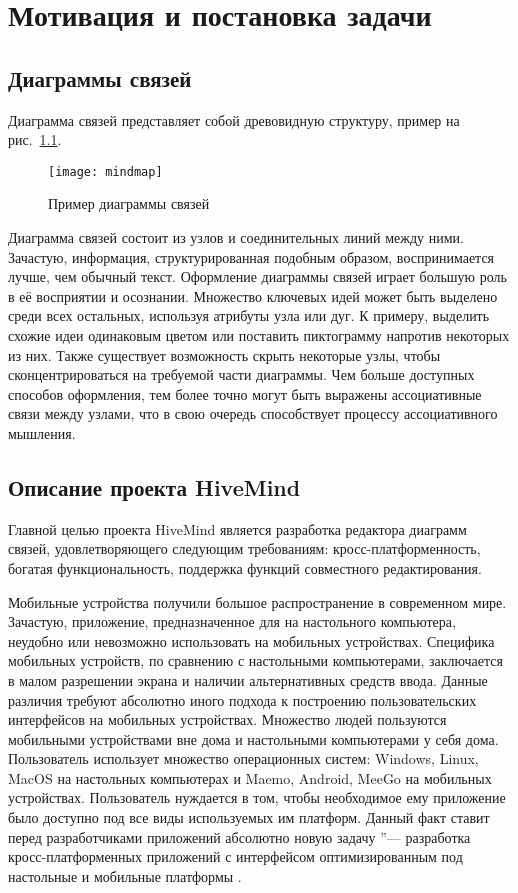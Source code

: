\newpage

\chapter{Мотивация и постановка задачи}
\label{ch:chapter_1}

\section{Диаграммы связей}
\label{sec:mindmaps}
Диаграмма связей представляет собой древовидную структуру, пример на
рис.~\ref{pic:mindmap}.

\begin{figure}[h!]
  \centering \texttt{[image: mindmap]}
  \caption{Пример диаграммы связей}
  \label{pic:mindmap}
\end{figure}

Диаграмма связей состоит из узлов и соединительных линий между ними. Зачастую,
информация, структурированная подобным образом, воспринимается лучше, чем
обычный текст. Оформление диаграммы связей играет большую роль в её восприятии и
осознании. Множество ключевых идей может быть выделено среди всех остальных,
используя атрибуты узла или дуг. К примеру, выделить схожие идеи одинаковым
цветом или поставить пиктограмму напротив некоторых из них. Также существует
возможность скрыть некоторые узлы, чтобы сконцентрироваться на требуемой части
диаграммы. Чем больше доступных способов оформления, тем более точно могут быть
выражены ассоциативные связи между узлами, что в свою очередь способствует
процессу ассоциативного мышления.


\section{Описание проекта HiveMind}
\label{sec:project_summary}
Главной целью проекта HiveMind является разработка редактора диаграмм связей,
удовлетворяющего следующим требованиям: кросс-платформенность, богатая
функциональность, поддержка функций совместного редактирования.

Мобильные устройства получили большое распространение в современном мире.
Зачастую, приложение, предназначенное для на настольного компьютера, неудобно
или невозможно использовать на мобильных устройствах. Специфика мобильных
устройств, по сравнению с настольными компьютерами, заключается в малом
разрешении экрана и наличии альтернативных средств ввода. Данные различия
требуют абсолютно иного подхода к построению пользовательских интерфейсов на
мобильных устройствах. Множество людей пользуются мобильными устройствами вне
дома и настольными компьютерами у себя дома. Пользователь использует множество
операционных систем: Windows, Linux, MacOS на настольных компьютерах и Maemo,
Android, MeeGo на мобильных устройствах. Пользователь нуждается в том, чтобы
необходимое ему приложение было доступно под все виды используемых им платформ.
Данный факт ставит перед разработчиками приложений абсолютно новую задачу  ''---
разработка кросс-платформенных приложений с интерфейсом оптимизированным под
настольные и мобильные платформы \cite{hivemind-8th-fruct}.

